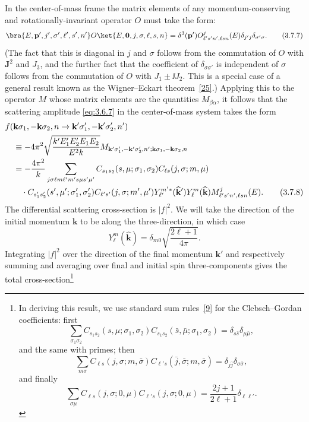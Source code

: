 In the center-of-mass frame the matrix elements of any momentum-conserving and
rotationally-invariant operator $O$ must take the form:
\begin{equation}
  \bra{E,\mathbf p',j',\sigma',\ell',s',n'}O
  \ket{E,\mathbf 0,j,\sigma,\ell,s,n}
  =\delta^3(\mathbf p')O^j_{\ell's'n',\ell sn}(E)
    \delta_{j'j}\delta_{\sigma'\sigma}.
  \tag{3.7.7}\label{eq:3.7.7}
\end{equation}
(The fact that this is diagonal in $j$ and $\sigma$ follows from the
commutation of $O$ with $\mathbf J^2$ and $J_3$, and the further fact that the
coefficient of $\delta_{\sigma\sigma'}$ is independent of $\sigma$ follows
from the commutation of $O$ with $J_1\pm \ii J_2$. This is a special case of a
general result known as the Wigner--Eckart theorem~\hyperref[ref:3.25]{[25]}.) Applying this to the
operator $M$ whose matrix elements are the quantities $M_{\beta\alpha}$, it
follows that the scattering amplitude \eqref{eq:3.6.7} in the center-of-mass system
takes the form
\begin{align}
  &f(\mathbf k\sigma_1,-\mathbf k\sigma_2,n
       \to\mathbf k'\sigma'_1,-\mathbf k'\sigma'_2,n') \notag\\
  &\quad\equiv-4\pi^2
    \sqrt{\frac{k'E'_1E'_2E_1E_2}{E^2k}}
    M_{\mathbf k'\sigma'_1,-\mathbf k'\sigma'_2,n';
      \mathbf k\sigma_1,-\mathbf k\sigma_2,n} \notag\\
  &\quad=-\frac{4\pi^2}{k}
    \sum_{j\sigma\ell m\ell'm's\mu s'\mu'}
    C_{s_1s_2}(s,\mu;\sigma_1,\sigma_2)
    C_{\ell s}(j,\sigma;m,\mu) \notag\\
  &\qquad\cdot C_{s'_1s'_2}(s',\mu';\sigma'_1,\sigma'_2)
    C_{\ell's'}(j,\sigma;m',\mu')
    Y_{\ell'}^{m'*}(\widehat{\mathbf k}')Y_\ell^m(\widehat{\mathbf k})
    M^j_{\ell's'n',\ell sn}(E).
  \tag{3.7.8}\label{eq:3.7.8}
\end{align}
The differential scattering cross-section is $|f|^2$. We will take the
direction of the initial momentum $\mathbf k$ to be along the three-direction,
in which case
\begin{equation}
  Y_\ell^m(\widehat{\mathbf k})
  =\delta_{m0}\sqrt{\frac{2\ell+1}{4\pi}}.
  \tag{3.7.9}\label{eq:3.7.9}
\end{equation}
Integrating $|f|^2$ over the direction of the final momentum $\mathbf k'$ and
respectively summing and averaging over final and initial spin
three-components gives the total cross-section\footnote{In deriving this
result, we use standard sum rules~\hyperref[ref:3.9]{[9]} for the Clebsch--Gordan coefficients:
first
\[
 \sum_{\sigma_1\sigma_2}C_{s_1s_2}(s,\mu;\sigma_1,\sigma_2)
 C_{s_1s_2}(\bar s,\bar\mu;\sigma_1,\sigma_2)
 =\delta_{s\bar s}\delta_{\mu\bar\mu},
\]
and the same with primes; then
\[
 \sum_{m\sigma}C_{\ell s}(j,\sigma;m,\bar\sigma)
 C_{\ell's}(\bar j,\bar\sigma;m,\bar\sigma)
 =\delta_{j\bar j}\delta_{\sigma\bar\sigma},
\]
and finally
\[
 \sum_{\sigma\mu}C_{\ell s}(j,\sigma;0,\mu)
 C_{\ell's}(j,\sigma;0,\mu)=\frac{2j+1}{2\ell+1}\delta_{\ell\ell'}.
\]}
